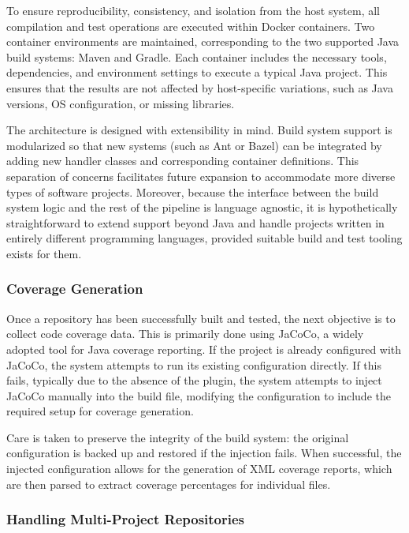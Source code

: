 To ensure reproducibility, consistency, and isolation from the host system, all compilation and test
operations are executed within Docker containers. Two container environments are maintained,
corresponding to the two supported Java build systems: Maven and Gradle. Each container includes the
necessary tools, dependencies, and environment settings to execute a typical Java project. This
ensures that the results are not affected by host-specific variations, such as Java versions, OS
configuration, or missing libraries.

The architecture is designed with extensibility in mind. Build system support is modularized so that
new systems (such as Ant or Bazel) can be integrated by adding new handler classes and corresponding
container definitions. This separation of concerns facilitates future expansion to accommodate more
diverse types of software projects. Moreover, because the interface between the build system logic
and the rest of the pipeline is language agnostic, it is hypothetically straightforward to extend
support beyond Java and handle projects written in entirely different programming languages,
provided suitable build and test tooling exists for them.

\subsubsection{Coverage Generation}

Once a repository has been successfully built and tested, the next objective is to collect code
coverage data. This is primarily done using JaCoCo, a widely adopted tool for Java coverage
reporting. If the project is already configured with JaCoCo, the system attempts to run its existing
configuration directly. If this fails, typically due to the absence of the plugin, the system attempts
to inject JaCoCo manually into the build file, modifying the configuration to include the required
setup for coverage generation.

Care is taken to preserve the integrity of the build system: the original configuration is backed up
and restored if the injection fails. When successful, the injected configuration allows for the
generation of XML coverage reports, which are then parsed to extract coverage percentages for
individual files.

\subsubsection{Handling Multi-Project Repositories}

